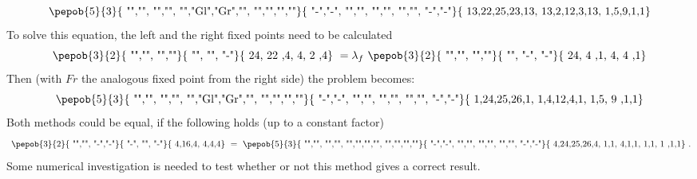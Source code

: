 \begin{equation}
    \vcenter{ \hbox{   \pepob{5}{3}{{
                        "","", "","",
                        "","Gl","Gr","",
                        "","","",""}}{{
                        "-","-",
                        "","",
                        "","",
                        "","",
                        "-","-"}}{{
                        13,22,25,23,13,
                        13,2,12,3,13,
                        1,5,9,1,1}} }}
\end{equation}
To solve this equation, the left and the right fixed points need to be calculated
\begin{equation}\label{eq:vumps_B_own}
    \vcenter{ \hbox{   \pepob{3}{2}{{
                        "","",
                        "",""}}{{
                        "",
                        "",
                        "-"}}{{
                        24, 22 ,4,
                        4,  2 ,4}} }} = \lambda_f    \vcenter{ \hbox{  \pepob{3}{2}{{
                        "","",
                        "",""}}{{
                        "",
                        "-",
                        "-"}}{{
                        24, 4 ,1,
                        4,  4 ,1}} }}
\end{equation}
Then (with $Fr$ the analogous fixed point from the right side) the problem becomes:
\begin{equation}
    \vcenter{ \hbox{   \pepob{5}{3}{{
                        "","", "","",
                        "","Gl","Gr","",
                        "","","",""}}{{
                        "-","-",
                        "","",
                        "","",
                        "","",
                        "-","-"}}{{
                        1,24,25,26,1,
                        1,4,12,4,1,
                        1,5, 9  ,1,1}} }}
\end{equation}
Both methods could be equal, if the following holds (up to a constant factor)
\begin{equation}
    \vcenter{ \hbox{  \pepob{3}{2}{{
                        "","",
                        "-","-"}}{{
                        "-",
                        "",
                        "-"}}{{
                        4,16,4,
                        4,4,4}} }} =   \vcenter{ \hbox{   \pepob{5}{3}{{
                        "","", "","",
                        "","","","",
                        "","","",""}}{{
                        "-","-",
                        "","",
                        "","",
                        "","",
                        "-","-"}}{{
                        4,24,25,26,4,
                        1,1, 4,1,1,
                        1,1, 1  ,1,1}} }}.
\end{equation}
Some numerical investigation is needed to test whether or not this method gives a correct result.

